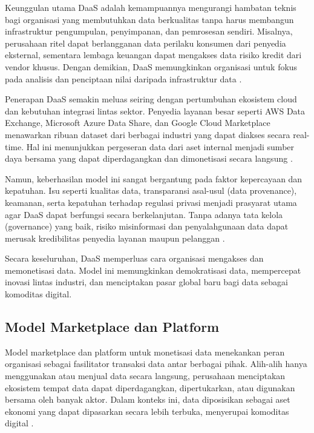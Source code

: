 Keunggulan utama DaaS adalah kemampuannya mengurangi hambatan teknis bagi organisasi yang membutuhkan data berkualitas tanpa harus membangun infrastruktur pengumpulan, penyimpanan, dan pemrosesan sendiri. Misalnya, perusahaan ritel dapat berlangganan data perilaku konsumen dari penyedia eksternal, sementara lembaga keuangan dapat mengakses data risiko kredit dari vendor khusus. Dengan demikian, DaaS memungkinkan organisasi untuk fokus pada analisis dan penciptaan nilai daripada infrastruktur data \cite{schmarzo2013bigdata}. 

Penerapan DaaS semakin meluas seiring dengan pertumbuhan ekosistem cloud dan kebutuhan integrasi lintas sektor. Penyedia layanan besar seperti AWS Data Exchange, Microsoft Azure Data Share, dan Google Cloud Marketplace menawarkan ribuan dataset dari berbagai industri yang dapat diakses secara real-time. Hal ini menunjukkan pergeseran data dari aset internal menjadi sumber daya bersama yang dapat diperdagangkan dan dimonetisasi secara langsung \cite{gorton2020monetising}.

Namun, keberhasilan model ini sangat bergantung pada faktor kepercayaan dan kepatuhan. Isu seperti kualitas data, transparansi asal-usul (data provenance), keamanan, serta kepatuhan terhadap regulasi privasi menjadi prasyarat utama agar DaaS dapat berfungsi secara berkelanjutan. Tanpa adanya tata kelola (governance) yang baik, risiko misinformasi dan penyalahgunaan data dapat merusak kredibilitas penyedia layanan maupun pelanggan \cite{sadiq2017}. 

Secara keseluruhan, DaaS memperluas cara organisasi mengakses dan memonetisasi data. Model ini memungkinkan demokratisasi data, mempercepat inovasi lintas industri, dan menciptakan pasar global baru bagi data sebagai komoditas digital.

\subsection{Model Marketplace dan Platform}

Model marketplace dan platform untuk monetisasi data menekankan peran organisasi sebagai fasilitator transaksi data antar berbagai pihak. Alih-alih hanya menggunakan atau menjual data secara langsung, perusahaan menciptakan ekosistem tempat data dapat diperdagangkan, dipertukarkan, atau digunakan bersama oleh banyak aktor. Dalam konteks ini, data diposisikan sebagai aset ekonomi yang dapat dipasarkan secara lebih terbuka, menyerupai komoditas digital \cite{zuiderwijk2021data, curry2016}.

